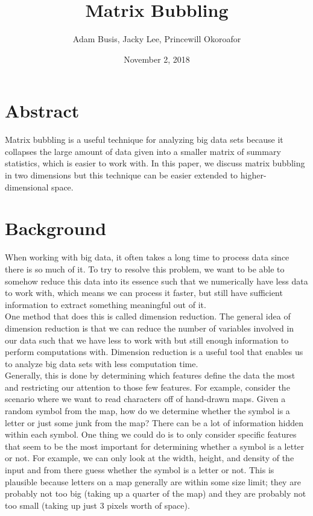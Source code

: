 \documentclass{article}
\title{Matrix Bubbling}
\author{Adam Busis, Jacky Lee, Princewill Okoroafor}
\date{November 2, 2018}
\begin{document}
\maketitle

\section{Abstract}

Matrix bubbling is a useful technique for analyzing big data sets because it
collapses the large amount of data given into a smaller matrix of summary
statistics, which is easier to work with. In this paper, we discuss matrix
bubbling in two dimensions but this technique can be easier extended to
higher-dimensional space.

\section{Background}

When working with big data, it often takes a long time to process data since
there is so much of it. To try to resolve this problem, we want to be able to
somehow reduce this data into its essence such that we numerically have less
data to work with, which means we can process it faster, but still have
sufficient information to extract something meaningful out of it.\\

One method that does this is called dimension reduction. The general idea of
dimension reduction is that we can reduce the number of variables involved in
our data such that we have less to work with but still enough information to
perform computations with. Dimension reduction is a useful tool that enables us
to analyze big data sets with less computation time.\\

Generally, this is done by determining which features define the data the most
and restricting our attention to those few features. For example, consider the
scenario where we want to read characters off of hand-drawn maps. Given a
random symbol from the map, how do we determine whether the symbol is a letter
or just some junk from the map? There can be a lot of information hidden within
each symbol. One thing we could do is to only consider specific features that
seem to be the most important for determining whether a symbol is a letter or
not. For example, we can only look at the width, height, and density of the
input and from there guess whether the symbol is a letter or not. This is
plausible because letters on a map generally are within some size limit; they
are probably not too big (taking up a quarter of the map) and they are probably
not too small (taking up just 3 pixels worth of space).\\
\end{document}
